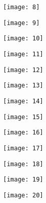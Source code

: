 \begin{figure}[H]
	\centering
	\texttt{[image: 8]}
\end{figure}

\begin{figure}[H]
	\centering
	\texttt{[image: 9]}
\end{figure}

\begin{figure}[H]
	\centering
	\texttt{[image: 10]}
\end{figure}



\begin{figure}[H]
	\centering
	\texttt{[image: 11]}
\end{figure}


\begin{figure}[H]
	\centering
	\texttt{[image: 12]}
\end{figure}

\begin{figure}[H]
	\centering
	\texttt{[image: 13]}
\end{figure}

\begin{figure}[H]
	\centering
	\texttt{[image: 14]}
\end{figure}

\begin{figure}[H]
	\centering
	\texttt{[image: 15]}
\end{figure}

\begin{figure}[H]
	\centering
	\texttt{[image: 16]}
\end{figure}

\newpage
\begin{figure}[H]
	\centering
	\texttt{[image: 17]}
\end{figure}

\newpage
\begin{figure}[H]
	\centering
	\texttt{[image: 18]}
\end{figure}

\begin{figure}[H]
	\centering
	\texttt{[image: 19]}
\end{figure}

\clearpage
\begin{figure}[H]
	\centering
	\texttt{[image: 20]}
\end{figure}

